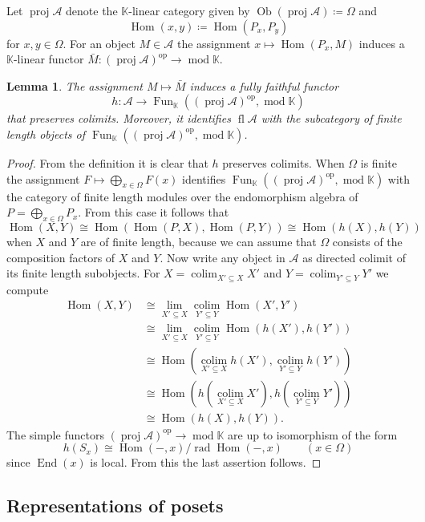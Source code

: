 \documentclass[a4paper]{amsart}
\theoremstyle{plain}
\newtheorem{lem}[thm]{Lemma}
\theoremstyle{definition}
\theoremstyle{remark}
\numberwithin{equation}{section}
\newcommand{\colim}{\operatorname*{colim}}
\newcommand{\End}{\operatorname{End}}
\newcommand{\fl}{\operatorname{fl}}
\newcommand{\Fun}{\operatorname{Fun}}
\newcommand{\Hom}{\operatorname{Hom}}
\renewcommand{\mod}{\operatorname{mod}}
\newcommand{\Ob}{\operatorname{Ob}}
\newcommand{\proj}{\operatorname{proj}}
\newcommand{\rad}{\operatorname{rad}}
\newcommand{\op}{\mathrm{op}}
\newcommand{\lto}{\longrightarrow}
\def\A{\mathcal A}
\def\bbK{\mathbb K}
\def\Om{\Omega}
\begin{document}
Let $\proj\A$ denote the $\bbK$-linear category given by
$\Ob(\proj\A)\coloneqq \Om$ and
\[\Hom(x,y)\coloneqq \Hom(P_x,P_y)\] for $x,y\in \Om$.
For an object $M\in\A$ the assignment
$x\mapsto\Hom(P_x,M)$ induces a $\bbK$-linear functor
$\bar M\colon(\proj\A)^\op\to \mod\bbK$.

\begin{lem}\label{le:ptfl}
  The assignment $M\mapsto\bar M$ induces a 
  fully faithful functor
  \[h\colon\A\lto\Fun_\bbK((\proj\A)^\op,\mod\bbK)\] that preserves
  colimits. Moreover, it identifies $\fl\A$ with the subcategory of
  finite length objects of $\Fun_\bbK((\proj\A)^\op,\mod\bbK)$.
\end{lem}
\begin{proof}
  From the definition it is clear that $h$ preserves colimits.
  When $\Om$ is finite the assignment $F\mapsto \bigoplus_{x\in \Om}F(x)$
  identifies $\Fun_\bbK((\proj\A)^\op,\mod\bbK)$ with the category of finite
 length  modules over the endomorphism algebra of
  $P=\bigoplus_{x\in \Om}P_x$.  From this case it follows that
  \[\Hom(X,Y)\cong \Hom(\Hom(P,X),\Hom(P,Y))\cong\Hom(h(X),h(Y))\]
  when $X$ and $Y$ are of finite length, because we can assume that
  $\Om$ consists of the composition factors of $X$ and $Y$.  Now write
  any object in $\A$ as directed colimit of its finite length
  subobjects.  For $X=\colim_{X'\subseteq X}X'$ and
  $Y=\colim_{Y'\subseteq Y}Y'$ we compute
  \begin{align*}
    \Hom(X,Y)&    \cong\lim_{X'\subseteq X}\colim_{Y'\subseteq
               Y}\Hom(X',Y')\\
             &\cong\lim_{X'\subseteq X}\colim_{Y'\subseteq
               Y}\Hom(h(X'),h(Y'))\\
             &\cong\Hom(\colim_{X'\subseteq
               X}h(X'),\colim_{Y'\subseteq Y}h(Y'))\\
             &\cong\Hom(h(\colim_{X'\subseteq
               X}X'),h(\colim_{Y'\subseteq Y}Y'))\\
             &\cong\Hom(h(X),h(Y)).
  \end{align*}
The simple functors   $(\proj\A)^\op\to\mod\bbK$ are up to
isomorphism of the form
\[h(S_x)\cong\Hom(-,x)/\rad\Hom(-,x) \qquad (x\in \Om)\]
since $\End(x)$ is local. From this the last assertion follows.
\end{proof}

\subsection*{Representations of posets}
\end{document}

